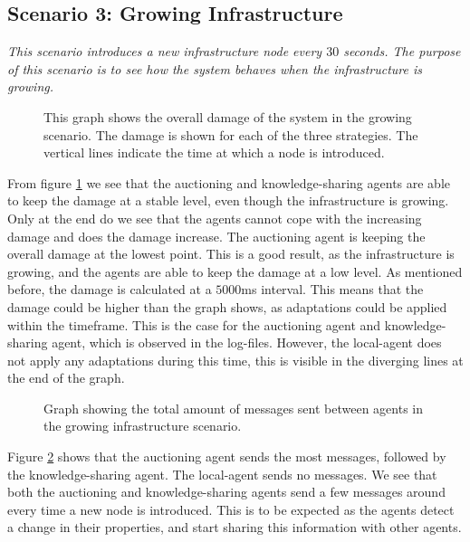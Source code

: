 \subsection{Scenario 3: Growing Infrastructure}
\textit{This scenario introduces a new infrastructure node every $30$ seconds. The purpose of this scenario is to see how the system behaves when the infrastructure is growing.}

\begin{figure}[H]
    \centering
    
    \caption{This graph shows the overall damage of the system in the growing scenario. The damage is shown for each of the three strategies. The vertical lines indicate the time at which a node is introduced.}
    \label{fig:overall-damage-growing}
\end{figure}

From figure \ref{fig:overall-damage-growing} we see that the auctioning and knowledge-sharing agents are able to keep the damage at a stable level, even though the infrastructure is growing. Only at the end do we see that the agents cannot cope with the increasing damage and does the damage increase. The auctioning agent is keeping the overall damage at the lowest point. This is a good result, as the infrastructure is growing, and the agents are able to keep the damage at a low level. 
As mentioned before, the damage is calculated at a $5000$ms interval. This means that the damage could be higher than the graph shows, as adaptations could be applied within the timeframe. This is the case for the auctioning agent and knowledge-sharing agent, which is observed in the log-files. However, the local-agent does not apply any adaptations during this time, this is visible in the diverging lines at the end of the graph.
 
\begin{figure}[H]
    \centering
    
    \caption{Graph showing the total amount of messages sent between agents in the growing infrastructure scenario.}
    \label{fig:messages-growing}
\end{figure}

Figure \ref{fig:messages-growing} shows that the auctioning agent sends the most messages, followed by the knowledge-sharing agent. The local-agent sends no messages. We see that both the auctioning and knowledge-sharing agents send a few messages around every time a new node is introduced. This is to be expected as the agents detect a change in their properties, and start sharing this information with other agents.

